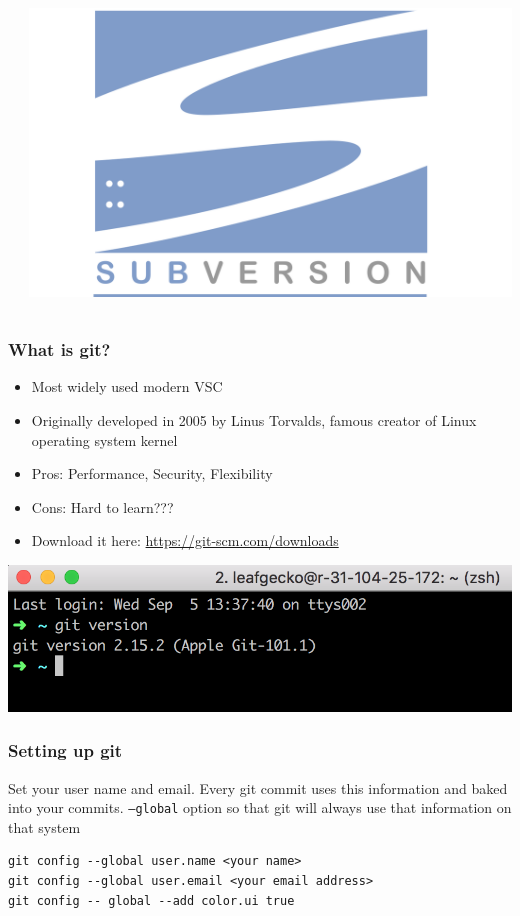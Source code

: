 \documentclass[12pt]{beamer}
\begin{document}
\begin{frame}
\begin{columns}
\begin{column}{0.33\linewidth}
	\end{column}
	\begin{column}{0.33\linewidth}
		\includegraphics[width=0.8\linewidth]{subversion_Logo}
	\end{column}
\end{columns}
\end{frame}

\begin{frame}
\frametitle{What is git?}
\begin{itemize}
	\item Most widely used modern VSC
	\item Originally developed in 2005 by Linus Torvalds, famous creator of Linux operating system kernel
	\item Pros: Performance, Security, Flexibility
	\item Cons: Hard to learn???
	\item Download it here: \url{https://git-scm.com/downloads}
\end{itemize}
\begin{center}	
	\includegraphics[width=0.5\linewidth]{git_screenshot}
\end{center}
\end{frame}

\begin{frame}[fragile]
\frametitle{Setting up git}
Set your user name and email. Every git commit uses this information and baked into your commits. \texttt{--global} option so that git will always use that information on that system
\begin{verbatim}
git config --global user.name <your name>
git config --global user.email <your email address>
git config -- global --add color.ui true
\end{verbatim}
\end{frame}
\end{document}
